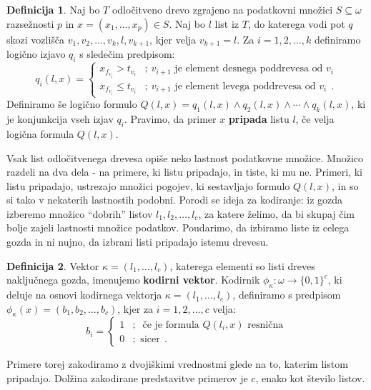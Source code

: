 \documentclass[12pt,a4paper,twoside]{article}
\theoremstyle{definition} %
\newtheorem{definicija}{Definicija}[section]
\theoremstyle{plain} %
\numberwithin{equation}{section}  %
\begin{document}
\begin{definicija}
\label{def-pripadnost-listu}
	Naj bo $T$ odločitveno drevo zgrajeno na podatkovni množici $S \subseteq \omega$ razsežnosti $p$ in $x=(x_1,\ldots,x_p) \in S$. 
	Naj bo $l$ list iz $T$, do katerega vodi pot $q$ skozi vozlišča $v_1, v_2, \ldots, v_k, l, v_{k+1}$, kjer velja $v_{k+1} = l$.
	Za $i=1,2,\ldots,k$ definiramo logično izjavo $q_i$ s sledečim predpisom:
	\[
	q_i(l,x) =
	\begin{cases}
	x_{f_{v_i}} > t_{v_i} &;\ v_{i+1} \text{ je element desnega poddrevesa od } v_i \\
	x_{f_{v_i}} \leq t_{v_i} &;\ v_{i+1} \text{ je element levega poddrevesa od } v_i\ \ .
	\end{cases}
	\]
	Definiramo še logično formulo $Q(l,x)=q_1(l,x) \land q_2(l,x) \land \cdots \land q_k(l,x)$, ki je konjunkcija vseh izjav $q_i$.
	Pravimo, da primer $x$ \textbf{pripada} listu $l$, če velja logična formula $Q(l,x)$.
\end{definicija}

Vsak list odločitvenega drevesa opiše neko lastnost podatkovne množice. 
Množico razdeli na dva dela - na primere, ki listu pripadajo, in tiste, ki mu ne.
Primeri, ki listu pripadajo, ustrezajo množici pogojev, ki sestavljajo formulo $Q(l,x)$, in so si tako v nekaterih lastnostih podobni. %
Porodi se ideja za kodiranje: iz gozda izberemo množico ``dobrih'' listov $l_1, l_2, \ldots, l_c$, za katere želimo, da bi skupaj čim bolje zajeli lastnosti množice podatkov.
Poudarimo, da izbiramo liste iz celega gozda in ni nujno, da izbrani listi pripadajo istemu drevesu.

\begin{definicija}
\label{def-kodiranje}
	Vektor $\kappa=(l_1,\ldots,l_c)$, katerega elementi so listi dreves naključnega gozda, imenujemo \textbf{kodirni vektor}.
	Kodirnik $\phi_\kappa: \omega \rightarrow \{0,1\}^c$, ki deluje na osnovi kodirnega vektorja $\kappa=(l_1,\ldots, l_c)$, definiramo s predpisom $\phi_\kappa(x) = (b_1, b_2, \ldots, b_c)$, kjer za $i=1,2,\ldots,c$ velja:
	$$
	b_i = 
	\begin{cases}
	1 &;\ \text{ če je formula } Q(l_i,x) \text{ resnična} \\
	0 &; \text{ sicer}\ \ .
	\end{cases}
	$$
\end{definicija}
Primere torej zakodiramo z dvojiškimi vrednostmi glede na to, katerim listom pripadajo. 
Dolžina zakodirane predstavitve primerov je $c$, enako kot število listov.
\end{document}
